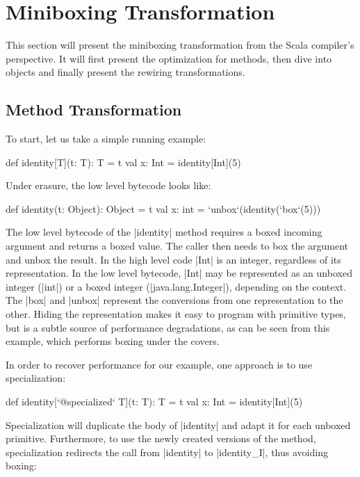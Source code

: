 \section{Miniboxing Transformation}

This section will present the miniboxing transformation from the Scala compiler's perspective. It will first present the optimization for methods, then dive into objects and finally present the rewiring transformations.

\subsection{Method Transformation}

To start, let us take a simple running example:

\begin{lstlisting-nobreak}
 def identity[T](t: T): T = t
 val x: Int = identity[Int](5)
\end{lstlisting-nobreak}

Under erasure, the low level bytecode looks like:

\begin{lstlisting-nobreak}
 def identity(t: Object): Object = t
 val x: int = `unbox`(identity(`box`(5)))
\end{lstlisting-nobreak}

The low level bytecode of the |identity| method requires a boxed incoming argument and returns a boxed value. The caller then needs to box the argument and unbox the result. In the high level code |Int| is an integer, regardless of its representation. In the low level bytecode, |Int| may be represented as an unboxed integer (|int|) or a boxed integer (|java.lang.Integer|), depending on the context. The |box| and |unbox| represent the conversions from one representation to the other. Hiding the representation makes it easy to program with primitive types, but is a subtle source of performance degradations, as can be seen from this example, which performs boxing under the covers.

In order to recover performance for our example, one approach is to use specialization:

\begin{lstlisting-nobreak}
 def identity[`@specialized` T](t: T): T = t
 val x: Int = identity[Int](5)
\end{lstlisting-nobreak}

Specialization will duplicate the body of |identity| and adapt it for each unboxed primitive. Furthermore, to use the newly created versions of the method, specialization redirects the call from |identity| to |identity_I|, thus avoiding boxing:

